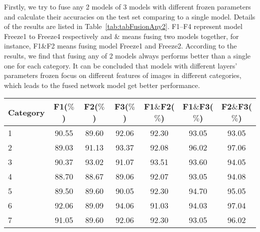 Firstly, we try to fuse any 2 models of 3 
models with different frozen parameters and 
calculate their accuracies on the test set 
comparing to a single model. Details of
the results are listed in 
Table~\ref{tab:tabFusionAny2}. 
F1–F4 represent model Freeze1 to Freeze4 
respectively and \& means fusing two
models together, for instance, F1\&F2 
means fusing model Freeze1 and Freeze2. 
According to the results, we find that 
fusing any of 2 models always performs 
better than a single one for each category. 
It can be concluded that models with 
different layers’ parameters frozen focus 
on different features of images in different 
categories, which leads to the fused network 
model get better performance.

\begin{table*}[!ht]
    \caption{Results of fusing any 2 models}
    \label{tab:tabFusionAny2}
    \setlength{\arrayrulewidth}{1.05 pt}
    \renewcommand{\arraystretch}{1.1}
    \begin{tabular*}{1.0\textwidth}{
        @{
            \extracolsep{\fill}
        }lcccccc
    }
        \hline
        
        Category & F1($\%$) & F2($\%$) & F3($\%$) 
        & F1$\&$F2($\%$) 
        & F1$\&$F3($\%$)  
        & F2$\&$F3($\%$)  \\
        
        \hline
        
        1 & 90.55 & 89.60 & 92.06 
        & 92.30 & 93.05 & 93.05 \\
        
        2 & 89.03 & 91.13 & 93.37 
        & 92.08 & 96.02 & 97.06 \\
        
        3 & 90.37 & 93.02 & 91.07 
        & 93.51 & 93.60 & 94.05 \\
        
        4 & 88.70 & 88.67 & 89.06 
        & 92.07 & 93.05 & 94.08 \\
        
        5 & 89.50 & 89.60 & 90.05 
        & 92.30 & 94.70 & 95.05 \\
        
        6 & 92.06 & 89.09 & 94.06 
        & 91.03 & 94.03 & 97.04 \\
        
        7 & 91.05 & 89.60 & 92.06 
        & 92.30 & 93.05 & 96.02 \\
        
        \hline
    \end{tabular*}
\end{table*}

